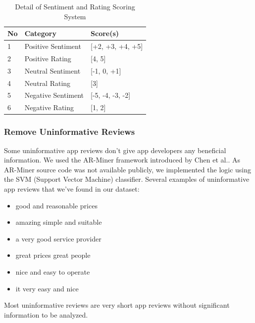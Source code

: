 \documentclass[12pt]{article}
\begin{document}
\begin{table}[!h]
\centering
\caption{Detail of Sentiment and Rating Scoring System}
\begin{tabular}{| l | l | l |}
	\hline
	\bf{No} & \bf{Category} & \bf{Score(s)} \\
	\hline
	1 & Positive Sentiment & [+2, +3, +4, +5] \\
	\hline
	2 & Positive Rating & [4, 5] \\
	\hline
	3 & Neutral Sentiment & [-1, 0, +1] \\
	\hline
	4 & Neutral Rating & [3] \\
	\hline
	5 & Negative Sentiment & [-5, -4, -3, -2] \\
	\hline
	6 & Negative Rating & [1, 2] \\
	\hline
\end{tabular}
\label{tab:statements}
\end{table}


\newpage
\subsubsection{Remove Uninformative Reviews}
Some uninformative app reviews don’t give app developers any beneficial information. We used the AR-Miner framework introduced by Chen et al.\cite{arminer}. As AR-Miner source code was not available publicly, we implemented the logic using the SVM (Support Vector Machine) classifier. Several examples of uninformative app reviews that we’ve found in our dataset:

\begin{itemize}
\itemsep0em
\item good and reasonable prices
\item amazing simple and suitable
\item a very good service provider
\item great prices great people
\item nice and easy to operate
\item it very easy and nice
\end{itemize}

Most uninformative reviews are very short app reviews without significant information to be analyzed.
\end{document}

